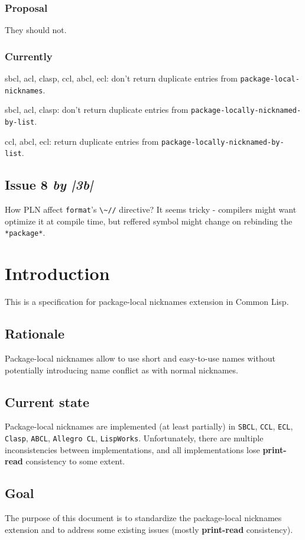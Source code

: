 \documentclass[11pt]{article}
\begin{document}
\subsubsection{Proposal}
\label{sec:orga763977}
They should not.
\subsubsection{Currently}
\label{sec:orgeb70875}
sbcl, acl, clasp, ccl, abcl, ecl: don't return duplicate entries from \texttt{package-local-nicknames}.

sbcl, acl, clasp: don't return duplicate entries from \texttt{package-locally-nicknamed-by-list}.

ccl, abcl, ecl: return duplicate entries from \texttt{package-locally-nicknamed-by-list}.
\subsection{Issue 8 \emph{by |3b|}}
\label{sec:org09f8c0b}
How PLN affect \texttt{format}'s \texttt{\textbackslash{}\textasciitilde{}//} directive? It seems tricky - compilers might
want optimize it at compile time, but reffered symbol might change on
rebinding the \texttt{*package*}.

\section{Introduction}
\label{sec:org237aeb5}
This is a specification for package-local nicknames extension in Common Lisp.
\subsection{Rationale}
\label{sec:org56fbb2d}
Package-local nicknames allow to use short and easy-to-use names without
potentially introducing name conflict as with normal nicknames.
\subsection{Current state}
\label{sec:org234563e}
Package-local nicknames are implemented (at least partially) in \texttt{SBCL},
\texttt{CCL}, \texttt{ECL}, \texttt{Clasp}, \texttt{ABCL}, \texttt{Allegro CL}, \texttt{LispWorks}. Unfortunately,
there are multiple inconsistencies between implementations, and all
implementations lose \textbf{print-read} consistency to some extent.
\subsection{Goal}
\label{sec:org5f00085}
The purpose of this document is to standardize the package-local nicknames
extension and to address some existing issues (mostly \textbf{print-read}
consistency).
\end{document}
